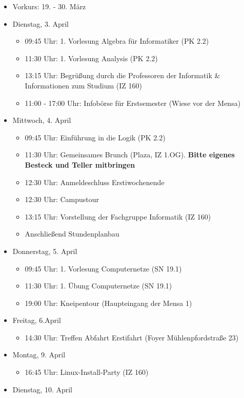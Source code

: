 \begin{itemize}
	\item Vorkurs: 19. - 30. März
	\item Dienstag, 3. April
	\begin{itemize}
		\item 09:45 Uhr: 1. Vorlesung Algebra für Informatiker (PK 2.2)
		\item 11:30 Uhr: 1. Vorlesung Analysis (PK 2.2)
		\item 13:15 Uhr: Begrüßung durch die Professoren der Informatik \& Informationen zum Studium (IZ 160)
		\item 11:00 - 17:00 Uhr: Infobörse für Erstsemester (Wiese vor der Mensa)
	\end{itemize}
	\item Mittwoch, 4. April
	\begin{itemize}
		\item 09:45 Uhr: Einführung in die Logik (PK 2.2)
		\item 11:30 Uhr: Gemeinsames Brunch (Plaza, IZ 1.OG). \textbf{Bitte eigenes Besteck und Teller mitbringen}
		\item 12:30 Uhr: Anmeldeschluss Erstiwochenende
		\item 12:30 Uhr: Campustour
		\item 13:15 Uhr: Vorstellung der Fachgruppe Informatik (IZ 160)
		\item Anschließend Stundenplanbau
	\end{itemize}
	\item Donnerstag, 5. April
	\begin{itemize}
		\item 09:45 Uhr: 1. Vorlesung Computernetze (SN 19.1)
		\item 11:30 Uhr: 1. Übung Computernetze (SN 19.1)
		\item 19:00 Uhr: Kneipentour (Haupteingang der Mensa 1)
	\end{itemize}
	\item Freitag, 6.April
	\begin{itemize}
		\item 14:30 Uhr: Treffen Abfahrt Erstifahrt (Foyer Mühlenpfordstraße 23)
	\end{itemize}
	\item Montag, 9. April
	\begin{itemize}
		\item 16:45 Uhr: Linux-Install-Party (IZ 160)
	\end{itemize}
	\item Dienstag, 10. April

\end{itemize}
